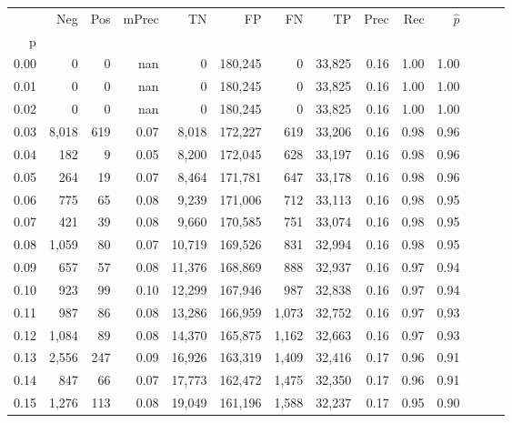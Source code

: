 \begin{tabular}{rrrrrrrrrrrrrr}
\toprule
{} &    Neg &  Pos & mPrec &       TN &       FP &      FN &      TP &  Prec &   Rec & $\hat{p}$ \\
p    &        &      &       &          &          &         &         &       &       &           \\
\midrule
0.00 &      0 &    0 &   nan &        0 &  180,245 &       0 &  33,825 &  0.16 &  1.00 &      1.00 \\
0.01 &      0 &    0 &   nan &        0 &  180,245 &       0 &  33,825 &  0.16 &  1.00 &      1.00 \\
0.02 &      0 &    0 &   nan &        0 &  180,245 &       0 &  33,825 &  0.16 &  1.00 &      1.00 \\
0.03 &  8,018 &  619 &  0.07 &    8,018 &  172,227 &     619 &  33,206 &  0.16 &  0.98 &      0.96 \\
0.04 &    182 &    9 &  0.05 &    8,200 &  172,045 &     628 &  33,197 &  0.16 &  0.98 &      0.96 \\
0.05 &    264 &   19 &  0.07 &    8,464 &  171,781 &     647 &  33,178 &  0.16 &  0.98 &      0.96 \\
0.06 &    775 &   65 &  0.08 &    9,239 &  171,006 &     712 &  33,113 &  0.16 &  0.98 &      0.95 \\
0.07 &    421 &   39 &  0.08 &    9,660 &  170,585 &     751 &  33,074 &  0.16 &  0.98 &      0.95 \\
0.08 &  1,059 &   80 &  0.07 &   10,719 &  169,526 &     831 &  32,994 &  0.16 &  0.98 &      0.95 \\
0.09 &    657 &   57 &  0.08 &   11,376 &  168,869 &     888 &  32,937 &  0.16 &  0.97 &      0.94 \\
0.10 &    923 &   99 &  0.10 &   12,299 &  167,946 &     987 &  32,838 &  0.16 &  0.97 &      0.94 \\
0.11 &    987 &   86 &  0.08 &   13,286 &  166,959 &   1,073 &  32,752 &  0.16 &  0.97 &      0.93 \\
0.12 &  1,084 &   89 &  0.08 &   14,370 &  165,875 &   1,162 &  32,663 &  0.16 &  0.97 &      0.93 \\
0.13 &  2,556 &  247 &  0.09 &   16,926 &  163,319 &   1,409 &  32,416 &  0.17 &  0.96 &      0.91 \\
0.14 &    847 &   66 &  0.07 &   17,773 &  162,472 &   1,475 &  32,350 &  0.17 &  0.96 &      0.91 \\
0.15 &  1,276 &  113 &  0.08 &   19,049 &  161,196 &   1,588 &  32,237 &  0.17 &  0.95 &      0.90 \\

\end{tabular}
